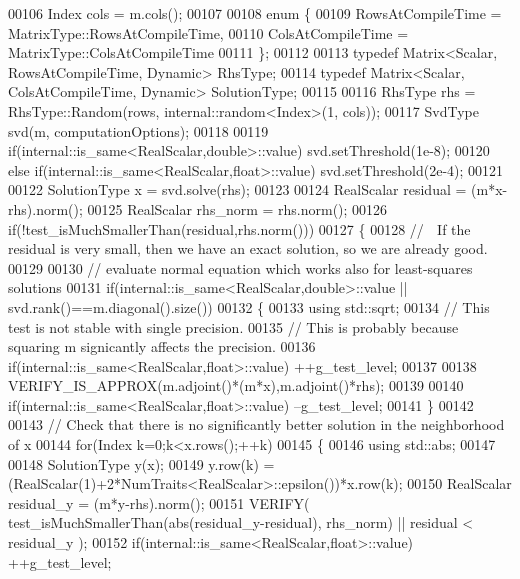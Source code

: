 \begin{DoxyCode}
00106   Index cols = m.cols();
00107 
00108   \textcolor{keyword}{enum} \{
00109     RowsAtCompileTime = MatrixType::RowsAtCompileTime,
00110     ColsAtCompileTime = MatrixType::ColsAtCompileTime
00111   \};
00112 
00113   \textcolor{keyword}{typedef} Matrix<Scalar, RowsAtCompileTime, Dynamic> RhsType;
00114   \textcolor{keyword}{typedef} Matrix<Scalar, ColsAtCompileTime, Dynamic> SolutionType;
00115 
00116   RhsType rhs = RhsType::Random(rows, internal::random<Index>(1, cols));
00117   SvdType svd(m, computationOptions);
00118 
00119        \textcolor{keywordflow}{if}(internal::is\_same<RealScalar,double>::value) svd.setThreshold(1e-8);
00120   \textcolor{keywordflow}{else} \textcolor{keywordflow}{if}(internal::is\_same<RealScalar,float>::value)  svd.setThreshold(2e-4);
00121 
00122   SolutionType x = svd.solve(rhs);
00123    
00124   RealScalar residual = (m*x-rhs).norm();
00125   RealScalar rhs\_norm = rhs.norm();
00126   \textcolor{keywordflow}{if}(!test\_isMuchSmallerThan(residual,rhs.norm()))
00127   \{
00128     \textcolor{comment}{// ^^^ If the residual is very small, then we have an exact solution, so we are already good.}
00129     
00130     \textcolor{comment}{// evaluate normal equation which works also for least-squares solutions}
00131     \textcolor{keywordflow}{if}(internal::is\_same<RealScalar,double>::value || svd.rank()==m.diagonal().size())
00132     \{
00133       \textcolor{keyword}{using} std::sqrt;
00134       \textcolor{comment}{// This test is not stable with single precision.}
00135       \textcolor{comment}{// This is probably because squaring m signicantly affects the precision.      }
00136       \textcolor{keywordflow}{if}(internal::is\_same<RealScalar,float>::value) ++g\_test\_level;
00137       
00138       VERIFY\_IS\_APPROX(m.adjoint()*(m*x),m.adjoint()*rhs);
00139       
00140       \textcolor{keywordflow}{if}(internal::is\_same<RealScalar,float>::value) --g\_test\_level;
00141     \}
00142     
00143     \textcolor{comment}{// Check that there is no significantly better solution in the neighborhood of x}
00144     \textcolor{keywordflow}{for}(Index k=0;k<x.rows();++k)
00145     \{
00146       \textcolor{keyword}{using} std::abs;
00147       
00148       SolutionType y(x);
00149       y.row(k) = (RealScalar(1)+2*NumTraits<RealScalar>::epsilon())*x.row(k);
00150       RealScalar residual\_y = (m*y-rhs).norm();
00151       VERIFY( test\_isMuchSmallerThan(abs(residual\_y-residual), rhs\_norm) || residual < residual\_y );
00152       \textcolor{keywordflow}{if}(internal::is\_same<RealScalar,float>::value) ++g\_test\_level;

\end{DoxyCode}
